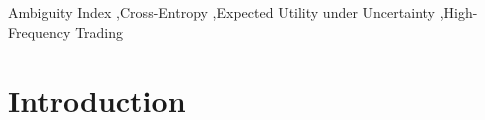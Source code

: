 \documentclass[preprint,12pt,authoryear]{elsarticle}
\begin{document}
\begin{frontmatter}


\begin{keyword}
Ambiguity Index \sep Cross-Entropy \sep Expected Utility under Uncertainty \sep High-Frequency Trading


\end{keyword}

\par
\end{frontmatter}



\section{Introduction}


\end{document}
